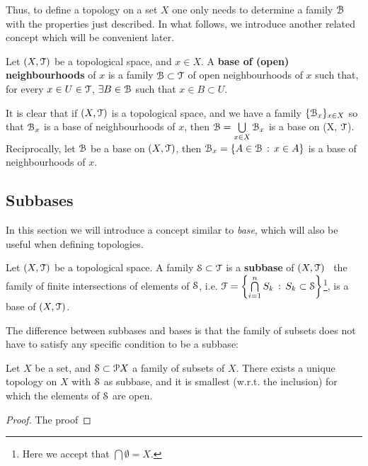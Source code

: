 Thus, to define a topology on a set $X$ one only needs to determine a family $\B$ with the properties just described.
%
In what follows, we introduce another related concept which will be convenient later.
%
\begin{definition}
Let $(X, \T)$ be a topological space, and $x\in X$. A \textbf{base of (open) neighbourhoods} of $x$ is a family $\B\subset\T$ of open neighbourhoods of $x$ such that, for every $x\in U\in \T$, $\exists B\in\B$ such that $x\in B\subset U$.
\label{def:base-open-neighbourhoods}
\end{definition}

It is clear that if $(X,\T)$ is a topological space, and we have a family $\{\B_x\}_{x\in X}$ so that $\B_x$ is a base of neighbourhoods of $x$, then $\B=\bigcup\limits_{x\in X}\B_x$ is a base on (X, $\T$). Reciprocally, let $\B$ be a base on $(X, \T)$, then $\B_x = \setdef{A\in\B}{x\in A}$ is a base of neighbourhoods of $x$.

\subsection{Subbases}

In this section we will introduce a concept similar to \emph{base}, which will also be useful when defining topologies.

\begin{definition}
Let $(X, \T)$ be a topological space. A family $\S\subset \T$ is a \textbf{subbase} of $(X, \T)$ \iff\ the family of finite intersections of elements of $\S$,  i.e. $\F = \setdef{\bigcap\limits_{i=1}^nS_k}{S_k\subset \S}$\footnote{Here we accept that $\bigcap \emptyset = X$.}, is a base of $(X, \T)$.
\label{def:subbase}
\end{definition}

The difference between subbases and bases is that the family of subsets does not have to satisfy any specific condition to be a subbase:

\begin{theorem}
Let $X$ be a set, and $\S\subset \P X$ a family of subsets of $X$. There exists a unique topology on $X$ with $\S$ as subbase, and it is smallest (w.r.t. the inclusion) for which the elements of $\S$ are open.
\end{theorem}

\begin{proof}
The proof 
\end{proof}
